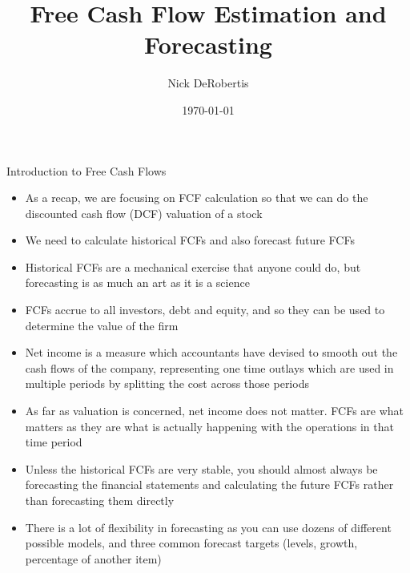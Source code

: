\documentclass[]{article}
\begin{document}
\title{Free Cash Flow Estimation and Forecasting}
\author{Nick DeRobertis}
\date{\today}
\maketitle
\begin{section}{Introduction to Free Cash Flows}
\begin{itemize}
\item As a recap, we are focusing on FCF calculation so that we can do the discounted cash flow (DCF) valuation of a stock
\item We need to calculate historical FCFs and also forecast future FCFs
\item Historical FCFs are a mechanical exercise that anyone could do, but forecasting is as much an art as it is a science
\item FCFs accrue to all investors, debt and equity, and so they can be used to determine the value of the firm
\item Net income is a measure which accountants have devised to smooth out the cash flows of the company, representing one time outlays which are used in multiple periods by splitting the cost across those periods
\item As far as valuation is concerned, net income does not matter. FCFs are what matters as they are what is actually happening with the operations in that time period
\item Unless the historical FCFs are very stable, you should almost always be forecasting the financial statements and calculating the future FCFs rather than forecasting them directly
\item There is a lot of flexibility in forecasting as you can use dozens of different possible models, and three common forecast targets (levels, growth, percentage of another item)
\end{itemize}
\end{section}
\end{document}
